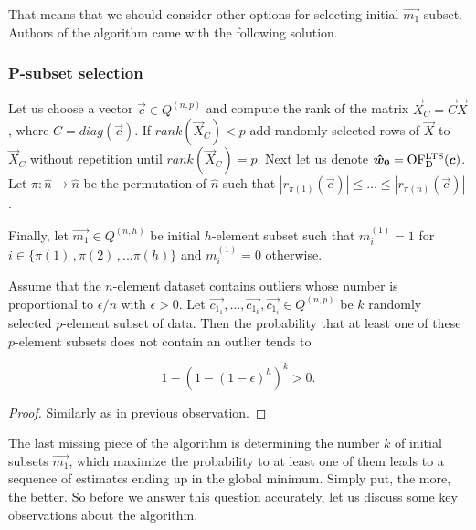 That means that we should consider other options for selecting initial $\vec{m_1}$ subset.
Authors of the algorithm came with the following solution.



\subsubsection*{P-subset selection} \label{section:random:p:samples}

Let us choose a vector $\vec{c} \in Q^{(n, p)}$ and compute the rank of the matrix $\vec{X}_{C} = \vec{C}\vec{X}$, where $C = diag(\vec{c})$. If $rank(\vec{X}_{C}) < p$ add randomly selected rows of $\vec{X}$ to $\vec{X}_{C}$ without repetition until $rank(\vec{X}_{C}) = p$. 
Next let us denote $\boldsymbol{\hat{w}_0} = \operatorname{OF^{LTS}_D}(\boldsymbol{c})$. Let
$\pi: \hat{n} \rightarrow \hat{n}$ be the permutation of $\hat{n}$ such that 
$|r_{\pi(1)}(\vec{c})| \leq \ldots \leq |r_{\pi(n)}(\vec{c})|$.

 Finally, let $\vec{m_1} \in Q^{(n,h)}$ be initial $h$-element subset such that $m^{(1)}_i = 1$ for $i \in \{{\pi(1)\,, \pi(2)\,,... \pi(h)\}}$ and  $m^{(1)}_i = 0$  otherwise.
\begin{observation} \label{prandomsamples}
    Assume that the $n$-element dataset contains outliers whose number is proportional to $\epsilon / n$ with $\epsilon > 0$. Let $\vec{c_{1_1}}, \ldots ,\vec{c_{1_k}}, \vec{c_{1_i}} \in Q^{(n, p)} $ be $k$ randomly selected $p$-element subset of data. Then the probability that at least one of these $p$-element subsets does not contain an outlier tends to

\begin{equation}
    1-(1-(1-\epsilon)^h)^k  > 0.
\end{equation}
\end{observation}

\begin{proof}
    Similarly as in previous observation.
\end{proof}

The last missing piece of the algorithm is determining the number $k$ of initial subsets $\vec{m_1}$, which maximize the probability to at least one of them leads to a sequence of estimates ending up in the global minimum. Simply put, the more, the better. So before we answer this question accurately, let us discuss some key observations about the algorithm.

